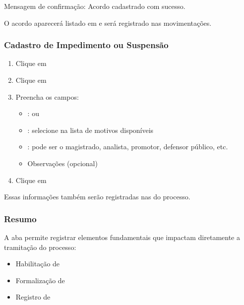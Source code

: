 \documentclass[letterpaper,10pt,brazil]{sphinxmanual}
\begin{document}
\sphinxAtStartPar
Mensagem de confirmação:
Acordo cadastrado com sucesso.

\sphinxAtStartPar
O acordo aparecerá listado em  e será registrado nas movimentações.


\subsubsection{Cadastro de Impedimento ou Suspensão}
\label{\detokenize{projud_22_cadastroperiodo:cadastro-de-impedimento-ou-suspensao}}\begin{enumerate}
%
\item {} 
\sphinxAtStartPar
Clique em 

\item {} 
\sphinxAtStartPar
Clique em 

\item {} 
\sphinxAtStartPar
Preencha os campos:
\begin{itemize}
\item {} 
\sphinxAtStartPar
{}:  ou 

\item {} 
\sphinxAtStartPar
{}: selecione na lista de motivos disponíveis

\item {} 
\sphinxAtStartPar
{}: pode ser o magistrado, analista, promotor, defensor público, etc.

\item {} 
\sphinxAtStartPar
Observações (opcional)

\end{itemize}

\item {} 
\sphinxAtStartPar
Clique em 

\end{enumerate}

\sphinxAtStartPar
Essas informações também serão registradas nas  do processo.


\subsubsection{Resumo}
\label{\detokenize{projud_22_cadastroperiodo:resumo}}
\sphinxAtStartPar
A aba  permite registrar elementos fundamentais que impactam diretamente a tramitação do processo:
\begin{itemize}
\item {} 
\sphinxAtStartPar
Habilitação de 

\item {} 
\sphinxAtStartPar
Formalização de 

\item {} 
\sphinxAtStartPar
Registro de 

\end{itemize}
\end{document}

